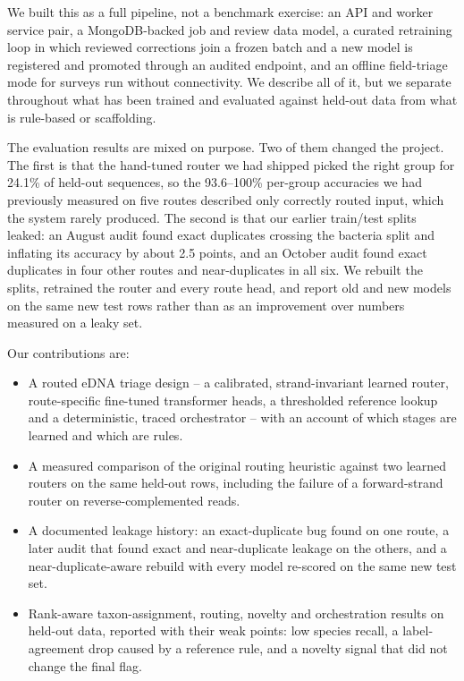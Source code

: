 \documentclass[conference]{IEEEtran}
\begin{document}
We built this as a full pipeline, not a benchmark exercise: an API and worker service pair, a MongoDB-backed job and review data model, a curated retraining loop in which reviewed corrections join a frozen batch and a new model is registered and promoted through an audited endpoint, and an offline field-triage mode for surveys run without connectivity. We describe all of it, but we separate throughout what has been trained and evaluated against held-out data from what is rule-based or scaffolding.

The evaluation results are mixed on purpose. Two of them changed the project. The first is that the hand-tuned router we had shipped picked the right group for 24.1\% of held-out sequences, so the 93.6--100\% per-group accuracies we had previously measured on five routes described only correctly routed input, which the system rarely produced. The second is that our earlier train/test splits leaked: an August audit found exact duplicates crossing the bacteria split and inflating its accuracy by about 2.5 points, and an October audit found exact duplicates in four other routes and near-duplicates in all six. We rebuilt the splits, retrained the router and every route head, and report old and new models on the same new test rows rather than as an improvement over numbers measured on a leaky set.

Our contributions are:
\begin{itemize}
\item A routed eDNA triage design -- a calibrated, strand-invariant learned router, route-specific fine-tuned transformer heads, a thresholded reference lookup and a deterministic, traced orchestrator -- with an account of which stages are learned and which are rules.
\item A measured comparison of the original routing heuristic against two learned routers on the same held-out rows, including the failure of a forward-strand router on reverse-complemented reads.
\item A documented leakage history: an exact-duplicate bug found on one route, a later audit that found exact and near-duplicate leakage on the others, and a near-duplicate-aware rebuild with every model re-scored on the same new test set.
\item Rank-aware taxon-assignment, routing, novelty and orchestration results on held-out data, reported with their weak points: low species recall, a label-agreement drop caused by a reference rule, and a novelty signal that did not change the final flag.
\end{itemize}
\end{document}
